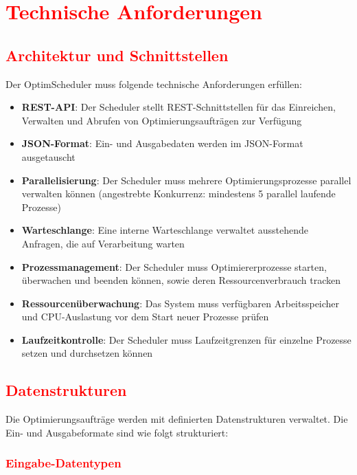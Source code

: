 \section{\textcolor{red}{Technische Anforderungen}}

\subsection{\textcolor{red}{Architektur und Schnittstellen}}

Der OptimScheduler muss folgende technische Anforderungen erfüllen:

\begin{itemize}
    \item \textbf{REST-API}: Der Scheduler stellt REST-Schnittstellen für das Einreichen, Verwalten und Abrufen von Optimierungsaufträgen zur Verfügung
    \item \textbf{JSON-Format}: Ein- und Ausgabedaten werden im JSON-Format ausgetauscht
    \item \textbf{Parallelisierung}: Der Scheduler muss mehrere Optimierungsprozesse parallel verwalten können (angestrebte Konkurrenz: mindestens 5 parallel laufende Prozesse)
    \item \textbf{Warteschlange}: Eine interne Warteschlange verwaltet ausstehende Anfragen, die auf Verarbeitung warten
    \item \textbf{Prozessmanagement}: Der Scheduler muss Optimiererprozesse starten, überwachen und beenden können, sowie deren Ressourcenverbrauch tracken
    \item \textbf{Ressourcenüberwachung}: Das System muss verfügbaren Arbeitsspeicher und CPU-Auslastung vor dem Start neuer Prozesse prüfen
    \item \textbf{Laufzeitkontrolle}: Der Scheduler muss Laufzeitgrenzen für einzelne Prozesse setzen und durchsetzen können
\end{itemize}

\subsection{\textcolor{red}{Datenstrukturen}}

Die Optimierungsaufträge werden mit definierten Datenstrukturen verwaltet. Die Ein- und Ausgabeformate sind wie folgt strukturiert:

\subsubsection{\textcolor{red}{Eingabe-Datentypen}}

